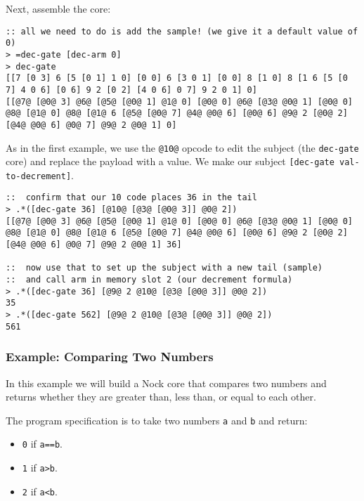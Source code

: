 \documentclass[twoside]{article}
\begin{document}
Next, assemble the core:

\begin{lstlisting}[style=listingblock]
:: all we need to do is add the sample! (we give it a default value of 0)
> =dec-gate [dec-arm 0]
> dec-gate
[[7 [0 3] 6 [5 [0 1] 1 0] [0 0] 6 [3 0 1] [0 0] 8 [1 0] 8 [1 6 [5 [0 7] 4 0 6] [0 6] 9 2 [0 2] [4 0 6] 0 7] 9 2 0 1] 0]
[[@7@ [@0@ 3] @6@ [@5@ [@0@ 1] @1@ 0] [@0@ 0] @6@ [@3@ @0@ 1] [@0@ 0] @8@ [@1@ 0] @8@ [@1@ 6 [@5@ [@0@ 7] @4@ @0@ 6] [@0@ 6] @9@ 2 [@0@ 2] [@4@ @0@ 6] @0@ 7] @9@ 2 @0@ 1] 0]
\end{lstlisting}

As in the first example, we use the \lstinline[style=inlinecode]{@10@} opcode to edit the subject (the \lstinline[style=inlinecode]{dec-gate} core) and replace the payload with a value.  We make our subject \lstinline[style=inlinecode]{[dec-gate val-to-decrement]}.

\begin{lstlisting}[style=listingblock]
::  confirm that our 10 code places 36 in the tail
> .*([dec-gate 36] [@10@ [@3@ [@0@ 3]] @0@ 2])
[[@7@ [@0@ 3] @6@ [@5@ [@0@ 1] @1@ 0] [@0@ 0] @6@ [@3@ @0@ 1] [@0@ 0] @8@ [@1@ 0] @8@ [@1@ 6 [@5@ [@0@ 7] @4@ @0@ 6] [@0@ 6] @9@ 2 [@0@ 2] [@4@ @0@ 6] @0@ 7] @9@ 2 @0@ 1] 36]

::  now use that to set up the subject with a new tail (sample)
::  and call arm in memory slot 2 (our decrement formula)
> .*([dec-gate 36] [@9@ 2 @10@ [@3@ [@0@ 3]] @0@ 2])
35
> .*([dec-gate 562] [@9@ 2 @10@ [@3@ [@0@ 3]] @0@ 2])
561
\end{lstlisting}

\subsubsection{Example:  Comparing Two Numbers}

In this example we will build a Nock core that compares two numbers and returns whether they are greater than, less than, or equal to each other.

The program specification is to take two numbers \lstinline[style=inlinecode]{a} and \lstinline[style=inlinecode]{b} and return:

\begin{itemize}
  \item  \lstinline[style=inlinecode]{0} if \lstinline[style=inlinecode]{a==b}.
  \item  \lstinline[style=inlinecode]{1} if \lstinline[style=inlinecode]{a>b}.
  \item  \lstinline[style=inlinecode]{2} if \lstinline[style=inlinecode]{a<b}.
\end{itemize}
\end{document}
